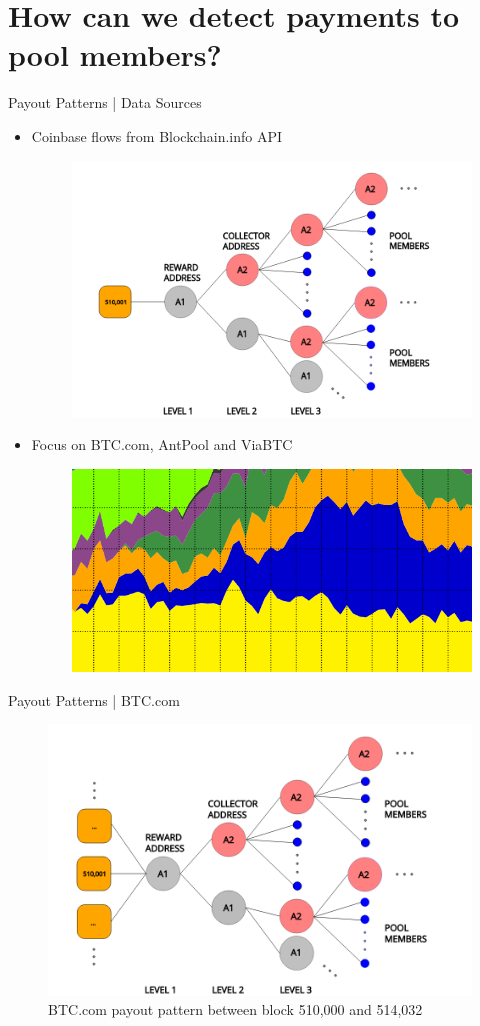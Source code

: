 \documentclass[10pt]{beamer}
\begin{document}
\section{How can we detect payments to pool members?}
\begin{frame}[fragile]{Payout Patterns | Data Sources}
    \begin{itemize}
        \item Coinbase flows from Blockchain.info API
        \begin{figure}
            \includegraphics[width=.4\textwidth]{images/flow_example.png}
        \end{figure}
        \pause

        \item Focus on BTC.com, AntPool and ViaBTC
        \begin{figure}
            \includegraphics[width=.35\textwidth]{images/selected_pools.png}
        \end{figure} 

    \end{itemize}
\end{frame}

\begin{frame}[fragile]{Payout Patterns | BTC.com}
    \begin{figure}
        \includegraphics[width=.8\textwidth]{images/flow_BTCcom_example1.png}
        \\BTC.com payout pattern between block 510,000 and 514,032
    \end{figure}
\end{frame}
\end{document}
